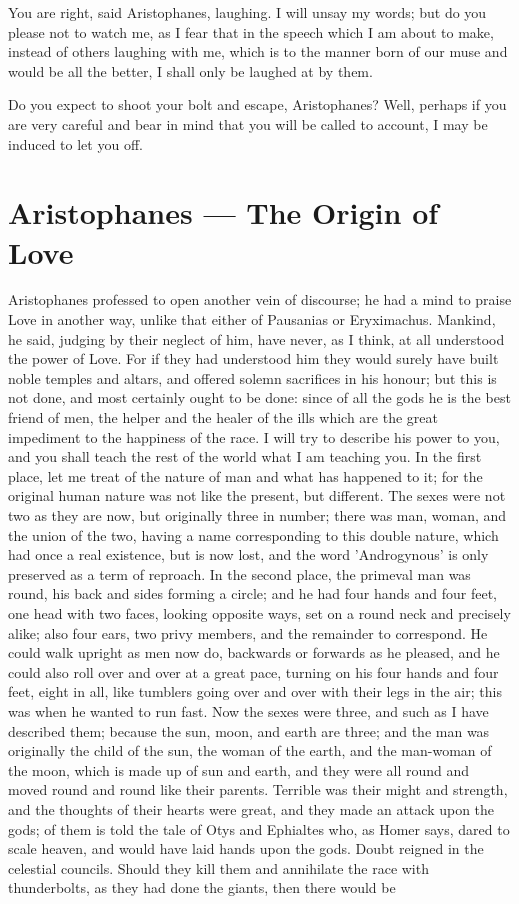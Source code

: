\para[62] You are right, said Aristophanes, laughing. I will unsay my words; but do you please not to watch me, as I fear that in the speech which I am about to make, instead of others laughing with me, which is to the manner born of our muse and would be all the better, I shall only be laughed at by them.

\para[63] Do you expect to shoot your bolt and escape, Aristophanes? Well, perhaps if you are very careful and bear in mind that you will be called to account, I may be induced to let you off.

\section*{Aristophanes — The Origin of Love}

\para[64] Aristophanes professed to open another vein of discourse; he had a mind to praise Love in another way, unlike that either of Pausanias or Eryximachus. Mankind, he said, judging by their neglect of him, have never, as I think, at all understood the power of Love. For if they had understood him they would surely have built noble temples and altars, and offered solemn sacrifices in his honour; but this is not done, and most certainly ought to be done: since of all the gods he is the best friend of men, the helper and the healer of the ills which are the great impediment to the happiness of the race. I will try to describe his power to you, and you shall teach the rest of the world what I am teaching you. In the first place, let me treat of the nature of man and what has happened to it; for the original human nature was not like the present, but different. The sexes were not two as they are now, but originally three in number; there was man, woman, and the union of the two, having a name corresponding to this double nature, which had once a real existence, but is now lost, and the word 'Androgynous' is only preserved as a term of reproach. In the second place, the primeval man was round, his back and sides forming a circle; and he had four hands and four feet, one head with two faces, looking opposite ways, set on a round neck and precisely alike; also four ears, two privy members, and the remainder to correspond. He could walk upright as men now do, backwards or forwards as he pleased, and he could also roll over and over at a great pace, turning on his four hands and four feet, eight in all, like tumblers going over and over with their legs in the air; this was when he wanted to run fast. Now the sexes were three, and such as I have described them; because the sun, moon, and earth are three; and the man was originally the child of the sun, the woman of the earth, and the man-woman of the moon, which is made up of sun and earth, and they were all round and moved round and round like their parents. Terrible was their might and strength, and the thoughts of their hearts were great, and they made an attack upon the gods; of them is told the tale of Otys and Ephialtes who, as Homer says, dared to scale heaven, and would have laid hands upon the gods. Doubt reigned in the celestial councils. Should they kill them and annihilate the race with thunderbolts, as they had done the giants, then there would be 